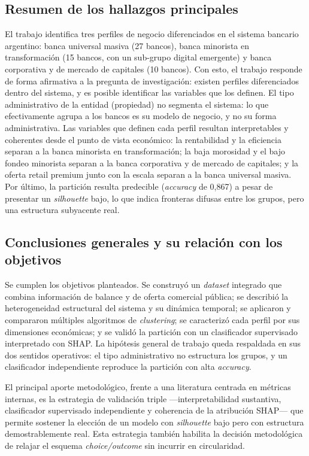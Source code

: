 \documentclass[11pt,a4paper]{article}
\begin{document}
\subsection{Resumen de los hallazgos principales}
El trabajo identifica tres perfiles de negocio diferenciados en el sistema bancario argentino: banca
universal masiva (27 bancos), banca minorista en transformación (15 bancos, con un sub-grupo digital
emergente) y banca corporativa y de mercado de capitales (10 bancos). Con esto, el trabajo responde de
forma afirmativa a la pregunta de investigación: existen perfiles diferenciados dentro del sistema, y es
posible identificar las variables que los definen. El tipo administrativo de la entidad
(propiedad) no segmenta el sistema: lo que efectivamente agrupa a los bancos es su modelo de negocio, y
no su forma administrativa. Las variables que definen cada perfil resultan interpretables y coherentes
desde el punto de vista económico: la rentabilidad y la eficiencia separan a la banca minorista en
transformación; la baja morosidad y el bajo fondeo minorista separan a la banca corporativa y de mercado
de capitales; y la oferta retail premium junto con la escala separan a la banca universal masiva. Por
último, la partición resulta predecible (\textit{accuracy} de 0,867) a pesar de presentar un
\textit{silhouette} bajo, lo que indica fronteras difusas entre los grupos, pero una estructura
subyacente real.

\subsection{Conclusiones generales y su relación con los objetivos}

Se cumplen los objetivos planteados. Se construyó un \textit{dataset} integrado que combina información de balance y de oferta comercial pública; se describió la heterogeneidad
estructural del sistema y su dinámica temporal; se aplicaron y compararon múltiples algoritmos de
\textit{clustering}; se caracterizó cada perfil por sus dimensiones económicas; y se validó la partición con
un clasificador supervisado interpretado con SHAP. La hipótesis general de trabajo queda respaldada en sus dos
sentidos operativos: el tipo administrativo no estructura los grupos, y un clasificador independiente reproduce
la partición con alta \textit{accuracy}.

El principal aporte metodológico, frente a una literatura centrada en métricas internas, es la
estrategia de validación triple ---interpretabilidad sustantiva, clasificador supervisado
independiente y coherencia de la atribución SHAP--- que permite sostener la elección de un modelo con
\textit{silhouette} bajo pero con estructura demostrablemente real. Esta estrategia también habilita la
decisión metodológica de relajar el esquema \textit{choice/outcome} sin incurrir en circularidad.
\end{document}
